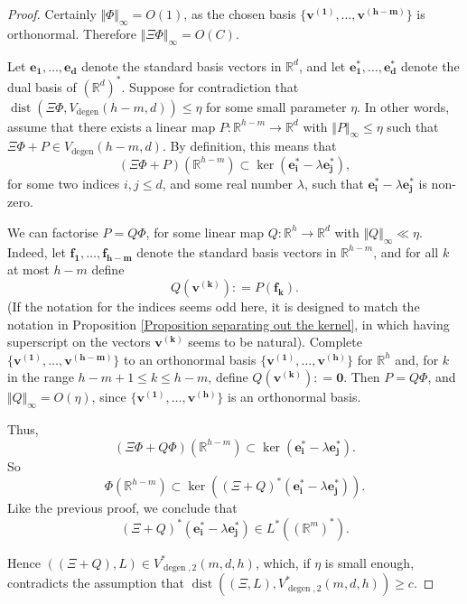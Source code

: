 \documentclass[12pt,a4paper,twoside,reqno]{amsart}
\newcommand{\degen}{\operatorname{degen}}
\numberwithin{equation}{section}
\begin{document}
\begin{proof}
Certainly $\Vert \Phi\Vert_{\infty} = O(1)$, as the chosen basis  $\{\mathbf{v^{(1)}},\dots, \mathbf{v^{(h-m)}}\}$ is orthonormal. Therefore $\Vert \Xi \Phi\Vert_{\infty} = O(C)$.
 

Let $\mathbf{e_1},\dots,\mathbf{e_d}$ denote the standard basis vectors in $\mathbb{R}^d$, and let $\mathbf{e}_\mathbf{1}^*, \dots,\mathbf{e}_\mathbf{d}^*$ denote the dual basis of $(\mathbb{R}^d)^*$. Suppose for contradiction that $\operatorname{dist}(\Xi\Phi, V_{\degen}(h-m,d)) \leqslant \eta$ for some small parameter $\eta$. In other words, assume that there exists a linear map $P:\mathbb{R}^{h-m}\longrightarrow \mathbb{R}^d$ with $\Vert P \Vert_\infty \leqslant  \eta$ such that $\Xi\Phi + P \in V_{\degen}(h-m,d)$. By definition, this means that \[ (\Xi\Phi + P)(\mathbb{R}^{h-m}) \subset \ker (\mathbf{e}_\mathbf{i}^* - \lambda \mathbf{e}_\mathbf{j}^* ),\] for some two indices $i,j \leqslant d$, and some real number $\lambda$, such that $\mathbf{e}_\mathbf{i}^* - \lambda \mathbf{e}_\mathbf{j}^*$ is non-zero. 

We can factorise $P = Q \Phi$, for some linear map $Q:\mathbb{R}^{h} \longrightarrow \mathbb{R}^d$ with $\Vert Q\Vert_\infty \ll \eta$. Indeed, let $\mathbf{f_1},\dots,\mathbf{f_{h-m}}$ denote the standard basis vectors in $\mathbb{R}^{h-m}$, and for all $k$ at most $h-m$ define \[Q(\mathbf{v^{(k)}}): = P(\mathbf{f_k}).\] (If the notation for the indices seems odd here, it is designed to match the notation in Proposition \ref{Proposition separating out the kernel}, in which having superscript on the vectors $\mathbf{v^{(k)}}$ seems to be natural). Complete $\{\mathbf{v^{(1)}},\dots, \mathbf{v^{(h-m)}}\}$ to an orthonormal basis $\{\mathbf{v^{(1)}},\dots, \mathbf{v^{(h)}}\}$ for $\mathbb{R}^h$ and, for $k$ in the range $h-m + 1 \leqslant k\leqslant h-m$, define $Q(\mathbf{v^{(k)}}): = \mathbf{0}$. Then $P = Q\Phi$, and $\Vert Q\Vert_\infty =O(\eta)$, since $\{\mathbf{v^{(1)}},\dots, \mathbf{v^{(h)}}\}$ is an orthonormal basis.

Thus, \[  (\Xi\Phi + Q  \Phi)(\mathbb{R}^{h-m}) \subset \ker (\mathbf{e}_\mathbf{i}^* - \lambda \mathbf{e}_\mathbf{j}^* ).\] So \[ \Phi(\mathbb{R}^{h-m})\subset \ker((\Xi + Q)^* (\mathbf{e}_\mathbf{i}^* - \lambda \mathbf{e}_\mathbf{j}^* )).\] Like the previous proof, we conclude that \[ (\Xi + Q)^* (\mathbf{e}_\mathbf{i}^* - \lambda \mathbf{e}_\mathbf{j}^* ) \in L^*((\mathbb{R}^{m})^*).\]

Hence $((\Xi + Q),L) \in V_{\degen,2}^*(m,d,h)$, which, if $\eta$ is small enough, contradicts the assumption that $\operatorname{dist}((\Xi,L),V^*_{\degen,2}(m,d,h))\geqslant c$.
\end{proof}
\end{document}
